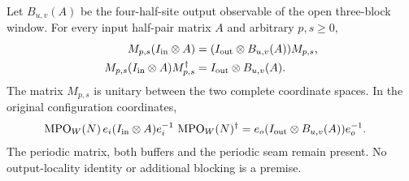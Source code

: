 \begin{lemma}
    \label{lem:mpu_direct_supplied_window_conjugation}
    \leanok
    Let $B_{u,v}(A)$ be the four-half-site output observable of the open
    three-block window. For every input half-pair matrix $A$ and arbitrary
    $p,s\ge0$,
    \begin{align}
        M_{p,s}(I_{\rm in}\otimes A)
         & =(I_{\rm out}\otimes B_{u,v}(A))M_{p,s},
        \label{eq:mpu_supplied_window_intertwiner}  \\
        M_{p,s}(I_{\rm in}\otimes A)M_{p,s}^\dagger
         & =I_{\rm out}\otimes B_{u,v}(A).
        \label{eq:mpu_supplied_window_conjugation}
    \end{align}
    The matrix $M_{p,s}$ is unitary between the two complete coordinate
    spaces. In the original configuration coordinates,
    \begin{align}
        \operatorname{MPO}_W(N)\,
        e_i(I_{\rm in}\otimes A)e_i^{-1}\,
        \operatorname{MPO}_W(N)^\dagger
         & =e_o(I_{\rm out}\otimes B_{u,v}(A))e_o^{-1}.
        \label{eq:mpu_supplied_window_original_conjugation}
    \end{align}
    The periodic matrix, both buffers and the periodic seam remain
    present. No output-locality identity or additional blocking is a premise.
\end{lemma}
